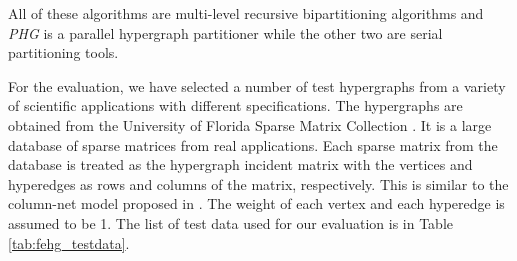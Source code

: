 \documentclass[twocolumn]{svjour3}          \smartqed
\begin{document}
All of these algorithms are multi-level recursive bipartitioning algorithms and \textit{PHG} is a parallel hypergraph partitioner while the other two are serial partitioning tools. 


For the evaluation, we have selected a number of test hypergraphs from a variety of  scientific applications with different specifications. The hypergraphs are obtained from the University of Florida Sparse Matrix Collection \cite{sparsecollection2011}. It is a large database of sparse matrices from real applications. Each sparse matrix from the database is treated as the hypergraph incident matrix with the vertices and hyperedges as rows and columns of the matrix, respectively. This is similar to the column-net model proposed in \cite{catayk1999}. The weight of each vertex and each hyperedge is assumed to be 1. The list of test data used for our evaluation is in Table \ref{tab:fehg_testdata}. 
\end{document}
